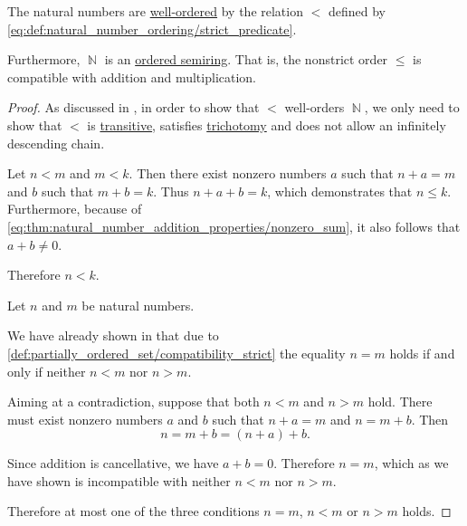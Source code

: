 \begin{proposition}\label{thm:natural_numbers_are_well_ordered}
  The natural numbers are \hyperref[def:well_ordered_set]{well-ordered} by the relation \( < \) defined by \eqref{eq:def:natural_number_ordering/strict_predicate}.

  Furthermore, \( \BbbN \) is an \hyperref[def:ordered_semiring]{ordered semiring}. That is, the nonstrict order \( \leq \) is compatible with addition and multiplication.
\end{proposition}
\begin{proof}
  As discussed in , in order to show that \( < \) well-orders \( \BbbN \), we only need to show that \( < \) is \hyperref[def:binary_relation/transitive]{transitive}, satisfies \hyperref[def:binary_relation/trichotomic]{trichotomy} and does not allow an infinitely descending chain.

   Let \( n < m \) and \( m < k \). Then there exist nonzero numbers \( a \) such that \( n + a = m \) and \( b \) such that \( m + b = k \). Thus \( n + a + b = k \), which demonstrates that \( n \leq k \). Furthermore, because of \eqref{eq:thm:natural_number_addition_properties/nonzero_sum}, it also follows that \( a + b \neq 0 \).

  Therefore \( n < k \).

   Let \( n \) and \( m \) be natural numbers.

  We have already shown in  that due to \eqref{def:partially_ordered_set/compatibility_strict} the equality \( n = m \) holds if and only if neither \( n < m \) nor \( n > m \).

  Aiming at a contradiction, suppose that both \( n < m \) and \( n > m \) hold. There must exist nonzero numbers \( a \) and \( b \) such that \( n + a = m \) and \( n = m + b \). Then
  \begin{equation*}
    n = m + b = (n + a) + b.
  \end{equation*}

  Since addition is cancellative, we have \( a + b = 0 \). Therefore \( n = m \), which as we have shown is incompatible with neither \( n < m \) nor \( n > m \).

  Therefore at most one of the three conditions \( n = m \), \( n < m \) or \( n > m \) holds.


\end{proof}
